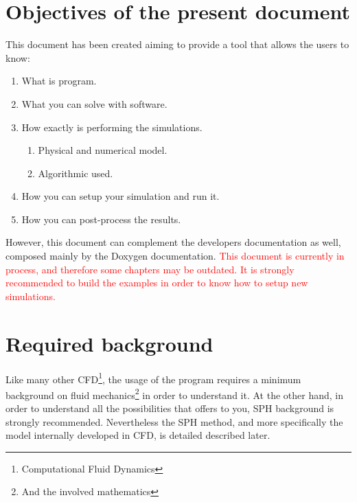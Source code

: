 \section{Objectives of the present document}
%
This document has been created aiming to provide a tool that allows the \NAME users to know:
%
\begin{enumerate}
	\item What is \NAME program.
	\item What you can solve with \NAME software.
	\item How exactly is \NAME performing the simulations.
	\begin{enumerate}
		\item Physical and numerical model.
		\item Algorithmic used.
	\end{enumerate}
	\item How you can setup your simulation and run it.
	\item How you can post-process the results.
\end{enumerate}
%
However, this document can complement the developers documentation as well, composed mainly
by the Doxygen documentation.\rc
%
\textcolor{red}{This document is currently in process, and therefore some 
chapters may be outdated.
%
It is strongly recommended to build the examples in order to know how to setup 
new simulations.}
%
\section{Required background}
%
Like many other CFD\footnote{Computational Fluid Dynamics}, the usage of the program requires
a minimum background on fluid mechanics\footnote{And the involved mathematics} in order to
understand it.\rc
%
At the other hand, in order to understand all the possibilities that \NAME offers to you, SPH
background is strongly recommended. Nevertheless the SPH method, and more specifically the
model internally developed in \NAME CFD, is detailed described later.
%
